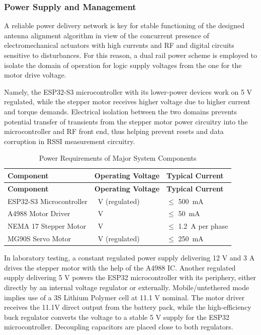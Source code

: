 \subsubsection{Power Supply and Management}

A reliable power delivery network is key for stable functioning of the designed antenna alignment algorithm in view of the concurrent presence of electromechanical actuators with high currents and RF and digital circuits sensitive to disturbances. For this reason, a dual rail power scheme is employed to isolate the domain of operation for logic supply voltages from the one for the motor drive voltage.

Namely, the ESP32-S3 microcontroller with its lower-power devices work on 5 V regulated, while the stepper motor receives higher voltage due to higher current and torque demands. Electrical isolation between the two domains prevents potential transfer of transients from the stepper motor power circuitry into the microcontroller and RF front end, thus helping prevent resets and data corruption in RSSI measurement circuitry.

{\setlength{\LTpre}{18pt}
 \setlength{\LTpost}{5pt}

\begin{longtable}{|
    >{\raggedright\arraybackslash}p{4.3cm} |
    >{\raggedright\arraybackslash}p{4.3cm} |
    >{\raggedright\arraybackslash}p{4.3cm} |}

\caption{Power Requirements of Major System Components}
\label{tab:power-management}\\
\hline
\textbf{Component} & \textbf{Operating Voltage} & \textbf{Typical Current} \\
\hline
\endfirsthead

\hline
\textbf{Component} & \textbf{Operating Voltage} & \textbf{Typical Current} \\
\hline
\endhead

ESP32-S3 Microcontroller & 5~V (regulated) & $\leq$ 500~mA \\
\hline
A4988 Motor Driver & 5~V & $\leq$ 50~mA \\
\hline
NEMA 17 Stepper Motor & 12~V & $\leq$ 1.2~A per phase \\
\hline
MG90S Servo Motor & 5~V (regulated) & $\leq$ 250~mA \\
\hline
\end{longtable}
}

In laboratory testing, a constant regulated power supply delivering 12 V and 3 A drives the stepper motor with the help of the A4988 IC. Another regulated supply delivering 5 V powers the ESP32 microcontroller with its periphery, either directly by an internal voltage regulator or externally. Mobile/untethered mode implies use of a 3S Lithium Polymer cell at 11.1 V nominal. The motor driver receives the 11.1V direct output from the battery pack, while the high-efficiency buck regulator converts the voltage to a stable 5 V supply for the ESP32 microcontroller. Decoupling capacitors are placed close to both regulators.